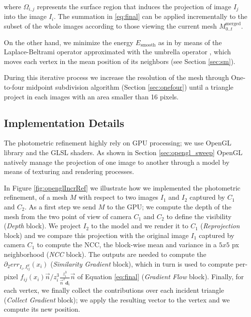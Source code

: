 where $\Omega_{i,j}$ represents the surface region that induces the projection of image $I_j$ into the image $I_i$.
The summation in \eqref{eq:final} can be applied incrementally to the subset of the whole images according to those viewing the current mesh $M_{0..t}^{\text{merged}}$.

On the other hand, we minimize the energy $E_{\textrm{smooth}}$ as in \cite{vu_et_al_2012} by means of the Laplace-Beltrami operator approximated with the umbrella operator \cite{wardetzky2007discrete}, which moves each vertex in the mean position of its neighbors (see Section \ref{sec:sm}).

During this iterative process we increase the resolution of the mesh through One-to-four midpoint subdivision algorithm (Section \ref{sec:onefour}) until a triangle project in each images with an area smaller than 16 pixels.

\subsection{Implementation Details}
The photometric refinement highly rely on GPU processing; we use OpenGL library \cite{opengl} and the GLSL shaders. As shown in Section \ref{sec:opengl_sweep} OpenGL natively manage the projection of one image to another through a model by means of texturing and rendering processes.

In Figure \ref{fig:openglIncrRef} we illustrate how we implemented the photometric refinement, of a mesh $\mathit{M}$ with respect to two images $I_{1}$ and $I_{2}$ captured by $C_{1}$ and $C_{2}$.
As a first step we send $\mathit{M}$  to  the GPU; we compute the depth of the mesh from the two point of view of camera $C_{1}$ and $C_{2}$ to define the visibility (\emph{Depth} block).
We project $I_{2}$ to the model and we render it to $C_{1}$ (\emph{Reprojection} block) and we compare this projection with the original image $I_{1}$ captured by camera $C_{1}$ to compute the NCC, the block-wise mean and variance  in a $5x5$ px neighborhood (\emph{NCC} block).
The outputs are needed to compute the $\partial_2 err_{I_i, I_{ij}^{\mathit{S}}}(x_i)$ (\emph{Similarity Gradient} block), which in turn is used to compute per-pixel $f_{ij}(x_i)  \overrightarrow{n}/z_i^3 \frac{z_i^3}{\overrightarrow{n}^T \mathbf{d}_i }\overrightarrow{n}$ of Equation \eqref{eq:final} (\emph{Gradient Flow} block). 
Finally, for each vertex, we finally collect the contributions over each incident triangle (\emph{Collect Gradient} block); we apply the resulting vector to the vertex and we compute its new position.

